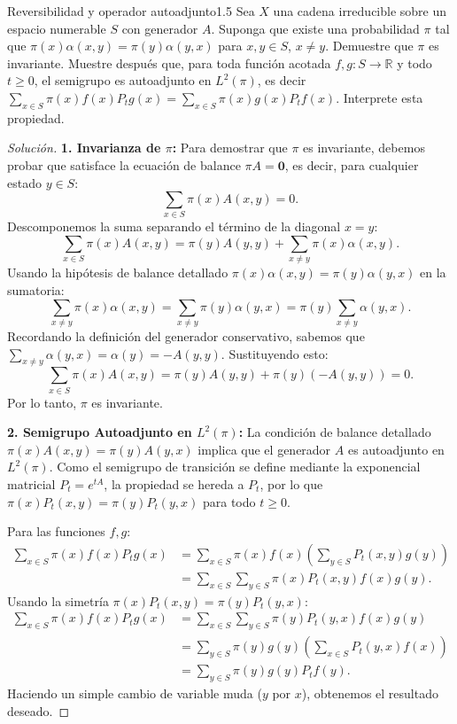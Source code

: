 \documentclass[10pt,a4paper]{article}
\begin{document}
\begin{ejercicio}{Reversibilidad y operador autoadjunto}{1.5}
    Sea $X$ una cadena irreducible sobre un espacio numerable $S$ con generador $A$. Suponga que existe una probabilidad $\pi$ tal que $\pi(x)\alpha(x,y) = \pi(y)\alpha(y,x)$ para $x,y \in S$, $x \neq y$. Demuestre que $\pi$ es invariante. Muestre después que, para toda función acotada $f,g: S \to \mathbb{R}$ y todo $t \ge 0$, el semigrupo es autoadjunto en $L^2(\pi)$,
    es decir $\sum_{x\in S}\pi(x)f(x)P_tg(x) = \sum_{x\in S}\pi(x)g(x)P_tf(x)$. Interprete esta propiedad.
\end{ejercicio}

\begin{proof}[Solución]
    \textbf{1. Invarianza de $\pi$:}
    Para demostrar que $\pi$ es invariante, debemos probar que satisface la ecuación de balance $\pi A = \mathbf{0}$, es decir, para cualquier estado $y \in S$:
    \[ \sum_{x \in S} \pi(x)A(x,y) = 0. \]
    Descomponemos la suma separando el término de la diagonal $x=y$:
    \[ \sum_{x \in S} \pi(x)A(x,y) = \pi(y)A(y,y) + \sum_{x \neq y} \pi(x)\alpha(x,y). \]
    Usando la hipótesis de balance detallado $\pi(x)\alpha(x,y) = \pi(y)\alpha(y,x)$  en la sumatoria:
    \[ \sum_{x \neq y} \pi(x)\alpha(x,y) = \sum_{x \neq y} \pi(y)\alpha(y,x) = \pi(y) \sum_{x \neq y} \alpha(y,x). \]
    Recordando la definición del generador conservativo, sabemos que $\sum_{x \neq y} \alpha(y,x) = \alpha(y) = -A(y,y)$. Sustituyendo esto:
    \[ \sum_{x \in S} \pi(x)A(x,y) = \pi(y)A(y,y) + \pi(y)(-A(y,y)) = 0. \]
    Por lo tanto, $\pi$ es invariante.

    \textbf{2. Semigrupo Autoadjunto en $L^2(\pi)$:}
    La condición de balance detallado $\pi(x)A(x,y) = \pi(y)A(y,x)$ implica que el generador $A$ es autoadjunto en $L^2(\pi)$. Como el semigrupo de transición se define mediante la exponencial matricial $P_t = e^{tA}$, la propiedad se hereda a $P_t$, por lo que $\pi(x)P_t(x,y) = \pi(y)P_t(y,x)$ para todo $t \ge 0$.
    
    Para las funciones $f, g$:
    \begin{align*}
        \sum_{x \in S} \pi(x)f(x)P_tg(x) &= \sum_{x \in S} \pi(x)f(x) \left( \sum_{y \in S} P_t(x,y)g(y) \right) \\
        &= \sum_{x \in S} \sum_{y \in S} \pi(x)P_t(x,y) f(x)g(y).
    \end{align*}
    Usando la simetría $\pi(x)P_t(x,y) = \pi(y)P_t(y,x)$:
    \begin{align*}
        \sum_{x \in S} \pi(x)f(x)P_tg(x) &= \sum_{x \in S} \sum_{y \in S} \pi(y)P_t(y,x) f(x)g(y) \\
        &= \sum_{y \in S} \pi(y)g(y) \left( \sum_{x \in S} P_t(y,x)f(x) \right) \\
        &= \sum_{y \in S} \pi(y)g(y) P_tf(y).
    \end{align*}
    Haciendo un simple cambio de variable muda ($y$ por $x$), obtenemos el resultado deseado.


\end{proof}
\end{document}
